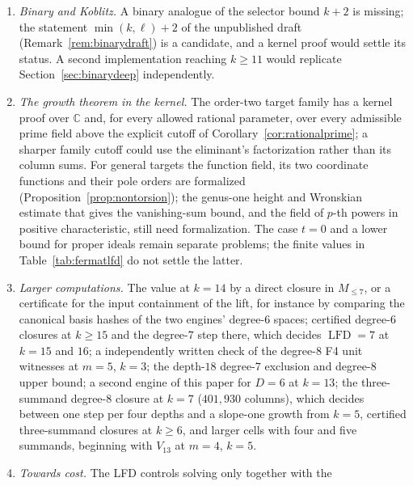\documentclass[11pt]{article}
\theoremstyle{definition}\newtheorem{definition}[theorem]{Definition}
\theoremstyle{remark}\newtheorem{remark}[theorem]{Remark}
\newcommand{\lfd}{\operatorname{LFD}}
\begin{document}
\begin{enumerate}
 that it exists for $k\le9$ without describing it (which carries, from which
 exponent patterns), and $\lfd\le5$ fails at $k=10$. In general the gap
 needs $1\in V_D(4D-11)$ for each $D$ (Section~\ref{sec:blockfour}) and its
 analogue for proper ideals. We found no inductive mechanism relating
 $V_D(k)$ to $V_{D+1}(k+4)$, which a proof of the block-of-four upper bound
 would need.
\item \emph{Binary and Koblitz.} A binary analogue of the selector bound
 $k+2$ is missing; the statement $\min(k,\ell)+2$ of the unpublished draft
 (Remark~\ref{rem:binarydraft}) is a candidate, and a kernel proof would
 settle its status. A second implementation reaching $k\ge11$ would
 replicate Section~\ref{sec:binarydeep} independently.
\item \emph{The growth theorem in the kernel.} The order-two target family
 has a kernel proof over $\mathbb{C}$ and, for every allowed rational
 parameter, over every admissible prime field above the explicit cutoff of
 Corollary~\ref{cor:rationalprime}; a sharper family cutoff could use the
 eliminant's factorization rather than its column sums. For general targets
 the function field, its two coordinate functions and their pole orders are
 formalized (Proposition~\ref{prop:nontorsion}); the genus-one height and
 Wronskian estimate that gives the vanishing-sum bound, and the field of
 $p$-th powers in positive characteristic, still need formalization. The
 case $t=0$ and a lower bound for proper ideals remain separate problems;
 the finite values in Table~\ref{tab:fermatlfd} do not settle the latter.
\item \emph{Larger computations.} The value at $k=14$ by a direct closure in
 $M_{\le7}$, or a certificate for the input containment of the lift, for
 instance by comparing the canonical basis hashes of the two engines'
 degree-$6$ spaces; certified degree-$6$ closures at $k\ge15$ and the
 degree-$7$ step there, which decides $\lfd=7$ at $k=15$ and $16$; a
 independently written check of the degree-$8$ F4 unit witnesses at
 $m=5$, $k=3$; the depth-$18$ degree-$7$ exclusion and degree-$8$ upper
 bound; a
 second engine of this paper for $D=6$ at $k=13$; the three-summand
 degree-$8$ closure at $k=7$ ($401{,}930$ columns), which decides between one
 step per four depths and a slope-one growth from $k=5$, certified
 three-summand closures at $k\ge6$, and larger cells with four and five
 summands, beginning with $V_{13}$ at $m=4$, $k=5$.
\item \emph{Towards cost.} The LFD controls solving only together with the

\end{enumerate}
\end{document}
